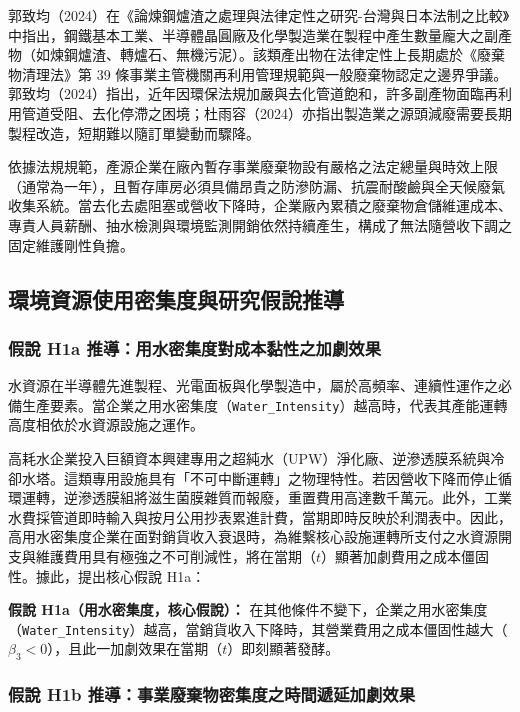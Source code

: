 \documentclass[12pt,a4paper]{article}
\begin{document}
郭致均（2024）在《論煉鋼爐渣之處理與法律定性之研究-台灣與日本法制之比較》中指出，鋼鐵基本工業、半導體晶圓廠及化學製造業在製程中產生數量龐大之副產物（如煉鋼爐渣、轉爐石、無機污泥）。該類產出物在法律定性上長期處於《廢棄物清理法》第 39 條事業主管機關再利用管理規範與一般廢棄物認定之邊界爭議。郭致均（2024）指出，近年因環保法規加嚴與去化管道飽和，許多副產物面臨再利用管道受阻、去化停滯之困境；杜雨容（2024）亦指出製造業之源頭減廢需要長期製程改造，短期難以隨訂單變動而驟降。

依據法規規範，產源企業在廠內暫存事業廢棄物設有嚴格之法定總量與時效上限（通常為一年），且暫存庫房必須具備昂貴之防滲防漏、抗震耐酸鹼與全天候廢氣收集系統。當去化去處阻塞或營收下降時，企業廠內累積之廢棄物倉儲維運成本、專責人員薪酬、抽水檢測與環境監測開銷依然持續產生，構成了無法隨營收下調之固定維護剛性負擔。

\subsection{環境資源使用密集度與研究假說推導}

\subsubsection{假說 H1a 推導：用水密集度對成本黏性之加劇效果}

水資源在半導體先進製程、光電面板與化學製造中，屬於高頻率、連續性運作之必備生產要素。當企業之用水密集度（\texttt{Water\_Intensity}）越高時，代表其產能運轉高度相依於水資源設施之運作。

高耗水企業投入巨額資本興建專用之超純水（UPW）淨化廠、逆滲透膜系統與冷卻水塔。這類專用設施具有「不可中斷運轉」之物理特性。若因營收下降而停止循環運轉，逆滲透膜組將滋生菌膜雜質而報廢，重置費用高達數千萬元。此外，工業水費採管道即時輸入與按月公用抄表累進計費，當期即時反映於利潤表中。因此，高用水密集度企業在面對銷貨收入衰退時，為維繫核心設施運轉所支付之水資源開支與維護費用具有極強之不可削減性，將在當期（$t$）顯著加劇費用之成本僵固性。據此，提出核心假說 H1a：

\textbf{假說 H1a（用水密集度，核心假說）：} 在其他條件不變下，企業之用水密集度（\texttt{Water\_Intensity}）越高，當銷貨收入下降時，其營業費用之成本僵固性越大（$\beta_3 < 0$），且此一加劇效果在當期（$t$）即刻顯著發酵。

\subsubsection{假說 H1b 推導：事業廢棄物密集度之時間遞延加劇效果}
\end{document}
